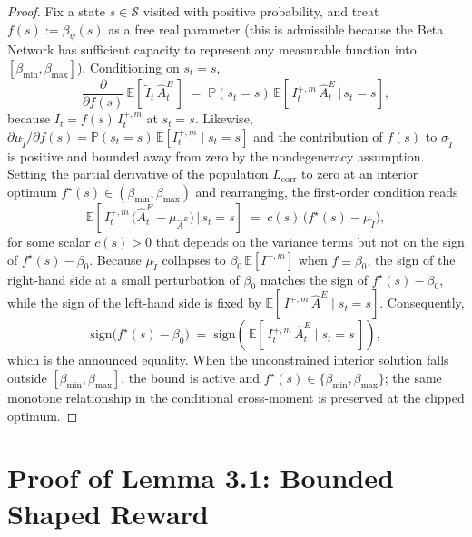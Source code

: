 \begin{proof}
Fix a state $s \in \mathcal{S}$ visited with positive probability, and treat $f(s) := \beta_\psi(s)$ as a free real parameter (this is admissible because the Beta Network has sufficient capacity to represent any measurable function into $[\beta_\text{min}, \beta_\text{max}]$). Conditioning on $s_t = s$,
\begin{equation*}
\frac{\partial}{\partial f(s)}\, \mathbb{E}\!\left[\, \tilde I_t\,\hat A_t^{E} \,\right]
\;=\; \mathbb{P}(s_t = s)\, \mathbb{E}\!\left[\, I_t^{+,m}\,\hat A_t^{E} \,\big|\, s_t = s \right],
\end{equation*}
because $\tilde I_t = f(s)\, I_t^{+,m}$ at $s_t = s$. Likewise, $\partial \mu_{\tilde I} / \partial f(s) = \mathbb{P}(s_t = s)\, \mathbb{E}[I_t^{+,m} \mid s_t = s]$ and the contribution of $f(s)$ to $\sigma_{\tilde I}$ is positive and bounded away from zero by the nondegeneracy assumption. Setting the partial derivative of the population $L_\text{corr}$ to zero at an interior optimum $f^\star(s) \in (\beta_\text{min}, \beta_\text{max})$ and rearranging, the first-order condition reads
\begin{equation*}
\mathbb{E}\!\left[\, I_t^{+,m}\,\bigl( \hat A_t^{E} - \mu_{\hat A^{E}} \bigr) \,\big|\, s_t = s \right]
\;=\;
c(s)\, \bigl( f^\star(s) - \mu_{\tilde I} \bigr),
\end{equation*}
for some scalar $c(s) > 0$ that depends on the variance terms but not on the sign of $f^\star(s) - \beta_0$. Because $\mu_{\tilde I}$ collapses to $\beta_0\,\mathbb{E}[I^{+,m}]$ when $f \equiv \beta_0$, the sign of the right-hand side at a small perturbation of $\beta_0$ matches the sign of $f^\star(s) - \beta_0$, while the sign of the left-hand side is fixed by $\mathbb{E}[\, I^{+,m}\,\hat A^{E} \mid s_t = s]$. Consequently,
\begin{equation*}
\mathrm{sign}\bigl( f^\star(s) - \beta_0 \bigr)
\;=\;
\mathrm{sign}\!\left(\, \mathbb{E}[\, I_t^{+,m}\, \hat A_t^{E} \mid s_t = s \,] \right),
\end{equation*}
which is the announced equality. When the unconstrained interior solution falls outside $[\beta_\text{min}, \beta_\text{max}]$, the bound is active and $f^\star(s) \in \{\beta_\text{min}, \beta_\text{max}\}$; the same monotone relationship in the conditional cross-moment is preserved at the clipped optimum.
\end{proof}

\section{Proof of Lemma 3.1: Bounded Shaped Reward}
\label{app:proof_bounded}

